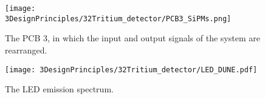 \begin{figure}[h]
\centering
\texttt{[image: 3DesignPrinciples/32Tritium\_detector/PCB3\_SiPMs.png]}
\caption{The PCB 3, in which the input and output signals of the system are rearranged.\label{fig:PCB3}}
\end{figure}

\begin{figure}[h]
\centering
\texttt{[image: 3DesignPrinciples/32Tritium\_detector/LED\_DUNE.pdf]}
\caption{The LED emission spectrum.\label{fig:LEDSpectrum}}
\end{figure}
